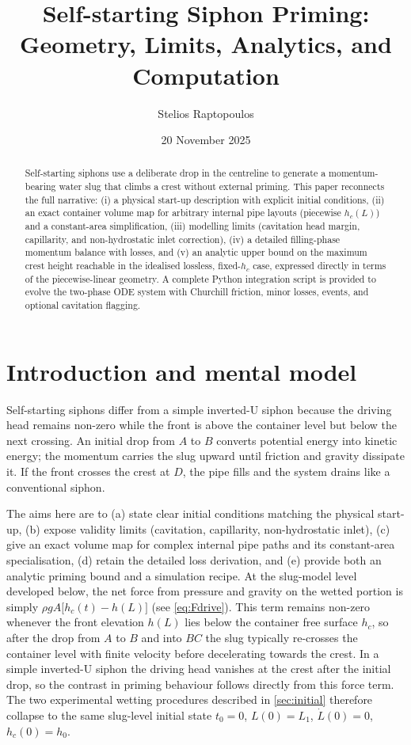 \documentclass[11pt]{article}
\title{Self-starting Siphon Priming: Geometry, Limits, Analytics, and Computation}
\author{Stelios Raptopoulos}
\date{20 November 2025}
\begin{document}
\maketitle

\begin{abstract}
Self-starting siphons use a deliberate drop in the centreline to generate a momentum-bearing water slug that climbs a crest without external priming. This paper reconnects the full narrative: (i) a physical start-up description with explicit initial conditions, (ii) an exact container volume map for arbitrary internal pipe layouts (piecewise $h_c(L)$) and a constant-area simplification, (iii) modelling limits (cavitation head margin, capillarity, and non-hydrostatic inlet correction), (iv) a detailed filling-phase momentum balance with losses, and (v) an analytic upper bound on the maximum crest height reachable in the idealised lossless, fixed-$h_c$ case, expressed directly in terms of the piecewise-linear geometry. A complete Python integration script is provided to evolve the two-phase ODE system with Churchill friction, minor losses, events, and optional cavitation flagging.
\end{abstract}

\tableofcontents

\section{Introduction and mental model}
Self-starting siphons differ from a simple inverted-U siphon because the driving head remains non-zero while the front is above the container level but below the next crossing. An initial drop from $A$ to $B$ converts potential energy into kinetic energy; the momentum carries the slug upward until friction and gravity dissipate it. If the front crosses the crest at $D$, the pipe fills and the system drains like a conventional siphon.

The aims here are to (a) state clear initial conditions matching the physical start-up, (b) expose validity limits (cavitation, capillarity, non-hydrostatic inlet), (c) give an exact volume map for complex internal pipe paths and its constant-area specialisation, (d) retain the detailed loss derivation, and (e) provide both an analytic priming bound and a simulation recipe.
At the slug-model level developed below, the net force from pressure and gravity on the wetted portion is simply $\rho g A\bigl[h_c(t)-h(L)\bigr]$ (see \eqref{eq:Fdrive}). This term remains non-zero whenever the front elevation $h(L)$ lies below the container free surface $h_c$, so after the drop from $A$ to $B$ and into $BC$ the slug typically re-crosses the container level with finite velocity before decelerating towards the crest. In a simple inverted-U siphon the driving head vanishes at the crest after the initial drop, so the contrast in priming behaviour follows directly from this force term. The two experimental wetting procedures described in \cref{sec:initial} therefore collapse to the same slug-level initial state $t_0=0$, $L(0)=L_1$, $\dot L(0)=0$, $h_c(0)=h_0$.
\end{document}
